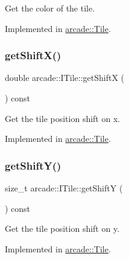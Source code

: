 Get the color of the tile. 



Implemented in \hyperlink{classarcade_1_1_tile_a33f158dcb0b991ca565562a41ede70ba}{arcade\+::\+Tile}.

\mbox{\label{classarcade_1_1_i_tile_aaa83bd96759c2c9f369be4b00b8a72d2}} 
\subsubsection{\texorpdfstring{get\+Shift\+X()}{getShiftX()}}
{\footnotesize\ttfamily double arcade\+::\+I\+Tile\+::get\+ShiftX (\begin{DoxyParamCaption}{ }\end{DoxyParamCaption}) const\hspace{0.3cm}{\ttfamily [pure virtual]}}



Get the tile position shift on x. 



Implemented in \hyperlink{classarcade_1_1_tile_a0db817dd3b7e0872e90d703bfea16005}{arcade\+::\+Tile}.

\mbox{\label{classarcade_1_1_i_tile_af7ca3cfb598eda00ac5b5f15f096e32f}} 
\subsubsection{\texorpdfstring{get\+Shift\+Y()}{getShiftY()}}
{\footnotesize\ttfamily size\+\_\+t arcade\+::\+I\+Tile\+::get\+ShiftY (\begin{DoxyParamCaption}{ }\end{DoxyParamCaption}) const\hspace{0.3cm}{\ttfamily [pure virtual]}}



Get the tile position shift on y. 



Implemented in \hyperlink{classarcade_1_1_tile_aa28fe418563d90bd65e1c58510d28eef}{arcade\+::\+Tile}.

\mbox{\label{classarcade_1_1_i_tile_a4c09e2ac12d75fe12e3d4d1ca4e08150}} 
